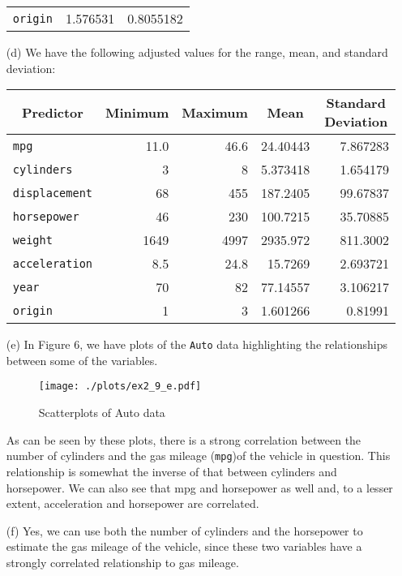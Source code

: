 \begin{itemize}
\begin{center}
\begin{tabular}{ l | r | r }
            \verb|origin| & 1.576531 & 0.8055182
        \end{tabular}
    \end{center}
    \item[(d)] We have the following adjusted values for the range, mean, and 
    standard deviation:
    \begin{center}
        \begin{tabular}{ l | r | r | r | r }
            \multicolumn{1}{c}{Predictor} & \multicolumn{1}{c}{Minimum} 
            & \multicolumn{1}{c}{Maximum} & \multicolumn{1}{c}{Mean} 
            & \multicolumn{1}{c}{Standard Deviation} \\
            \hline
            \verb|mpg| & 11.0 & 46.6 & 24.40443 & 7.867283 \\
            \verb|cylinders| & 3 & 8 & 5.373418 & 1.654179 \\
            \verb|displacement| & 68 & 455 & 187.2405 & 99.67837 \\
            \verb|horsepower| & 46 & 230 & 100.7215 & 35.70885 \\
            \verb|weight| & 1649 & 4997 & 2935.972 & 811.3002 \\
            \verb|acceleration| & 8.5 & 24.8 & 15.7269 & 2.693721 \\
            \verb|year| & 70 & 82 & 77.14557 & 3.106217 \\
            \verb|origin| & 1 & 3 & 1.601266 & 0.81991
        \end{tabular}
    \end{center}
    \item[(e)]
    In Figure 6, we have plots of the \verb|Auto| data highlighting the 
    relationships between some of the variables.
    \begin{figure}[!ht]
        \texttt{[image: ./plots/ex2\_9\_e.pdf]}
        \caption{Scatterplots of Auto data}
    \end{figure}
    As can be seen by these plots, there is a strong correlation between the
    number of cylinders and the gas mileage (\verb|mpg|)of the vehicle in question.
    This relationship is somewhat the inverse of that between cylinders and
    horsepower. We can also see that mpg and horsepower as well and, to a lesser
    extent, acceleration and horsepower are correlated.
    \item[(f)]
    Yes, we can use both the number of cylinders and the horsepower to estimate
    the gas mileage of the vehicle, since these two variables have a strongly
    correlated relationship to gas mileage.
\end{itemize}
